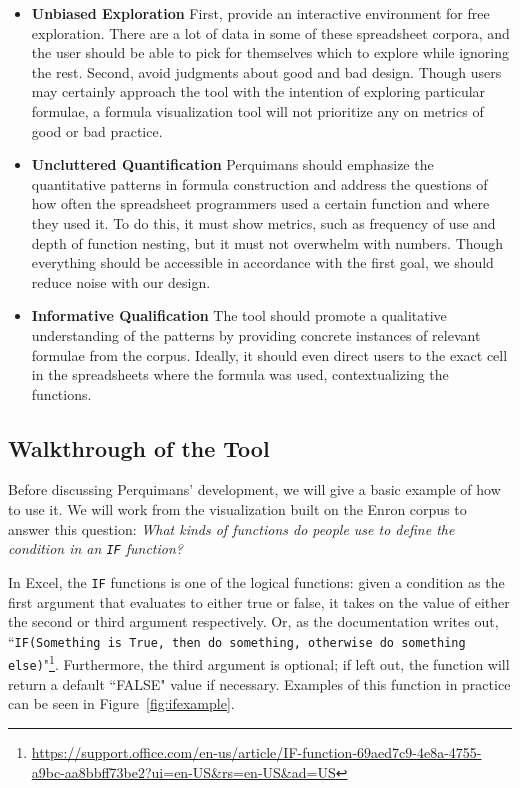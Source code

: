 \documentclass[conference]{IEEEtran}
\newcommand{\toolname}{Perquimans\xspace} \newcommand{\toolnameend}{Perquimans}
\newcommand{\toolnameposs}{Perquimans' }
\begin{document}
	\begin{itemize}
		
		\item [1] \textbf{Unbiased Exploration} First, provide an interactive
		environment for free exploration. There are a lot of data in some of these
		spreadsheet corpora, and the user should be able to pick for themselves which
		to explore while ignoring the rest. Second, avoid judgments about good and bad
		design. Though users may certainly approach the tool with the intention of
		exploring particular formulae, a formula visualization tool will not
		prioritize any on metrics of good or bad practice.
		
		\item [2] \textbf{Uncluttered Quantification} \toolname should emphasize the
		quantitative patterns in formula construction and address the questions of how
		often the spreadsheet programmers used a certain function and where they used
		it. To do this, it must show metrics, such as frequency of use and depth of
		function nesting, but it must not overwhelm with numbers. Though everything
		should be accessible in accordance with the first goal, we should reduce noise with our design.
		
		\item [3] \textbf{Informative Qualification} The tool should promote a qualitative understanding of the patterns by providing concrete instances of relevant
		formulae from the corpus. Ideally, it should even direct users to the exact
		cell in the spreadsheets where the formula was used, contextualizing the
		functions.
		
	\end{itemize}
	
	\subsection{Walkthrough of the Tool} \label{sec:walkthrough}Before discussing
	\toolnameposs development, we will give a basic example of how to use
	it. We will work from the visualization built on the Enron
	corpus to answer this question: \textit{ What kinds of functions do people use
		to define the condition in an \texttt{IF} function?}
	
	In Excel, the \texttt{IF} functions is one of the logical functions: given a condition
	as the first argument that evaluates to either true or false, it takes on the
	value of either the second or third argument respectively. Or, as the
	documentation writes out, ``\texttt{IF(Something is True, then do something, otherwise
	do something
	else)}"\footnote{\url{https://support.office.com/en-us/article/IF-function-69aed7c9-4e8a-4755-a9bc-aa8bbff73be2?ui=en-US\&rs=en-US\&ad=US}}. Furthermore, the third argument is optional; if left out, the function will return a default ``FALSE" value if necessary. Examples of this function in practice can be seen in Figure~\ref{fig:ifexample}.
	
\end{document}
